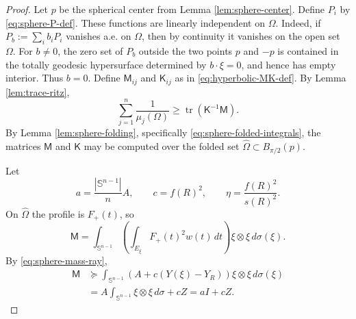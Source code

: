 \documentclass[11pt]{amsart}
\theoremstyle{remark}
\DeclareMathOperator{\tr}{tr}
\newcommand{\Sn}{\mathbb S}
\newcommand{\Id}{I}
\newcommand{\mcM}{\mathsf M}
\newcommand{\mcK}{\mathsf K}
\begin{document}
\begin{proof}
Let $p$ be the spherical center from Lemma \ref{lem:sphere-center}.  Define $P_i$ by \eqref{eq:sphere-P-def}.  These functions are linearly independent on $\Omega$.  Indeed, if $P_b:=\sum_i b_iP_i$ vanishes a.e. on $\Omega$, then by continuity it vanishes on the open set $\Omega$.  For $b\ne0$, the zero set of $P_b$ outside the two points $p$ and $-p$ is contained in the totally geodesic hypersurface determined by $b\cdot\xi=0$, and hence has empty interior.  Thus $b=0$.  Define $\mcM_{ij}$ and $\mcK_{ij}$ as in \eqref{eq:hyperbolic-MK-def}. By Lemma \ref{lem:trace-ritz},
\begin{equation}\label{eq:sphere-ritz-main}
        \sum_{j=1}^n\frac1{\mu_j(\Omega)}
        \ge \tr(\mcK^{-1}\mcM).
\end{equation}
By Lemma \ref{lem:sphere-folding}, specifically \eqref{eq:sphere-folded-integrals}, the matrices $\mcM$ and $\mcK$ may be computed over the folded set $\widehat\Omega\subset B_{\pi/2}(p)$.

Let
\begin{equation}\label{eq:sphere-aceta-def}
        a=\frac{|\Sn^{n-1}|}{n}A,
        \qquad
        c=f(R)^2,
        \qquad
        \eta=\frac{f(R)^2}{s(R)^2}.
\end{equation}
On $\widehat\Omega$ the profile is $F_+(t)$, so
$$
        \mcM
        =\int_{\Sn^{n-1}}
        \left(\int_{E_\xi}F_+(t)^2w(t)\,dt\right)
        \xi\otimes\xi\,d\sigma(\xi).
$$
By \eqref{eq:sphere-mass-ray},
\begin{align*}
        \mcM
        &\succeq
        \int_{\Sn^{n-1}}
        \left(A+c(Y(\xi)-Y_R)\right)
        \xi\otimes\xi\,d\sigma(\xi)\\
        &=A\int_{\Sn^{n-1}}\xi\otimes\xi\,d\sigma+cZ
        =a\Id+cZ.
\end{align*}


\end{proof}
\end{document}

